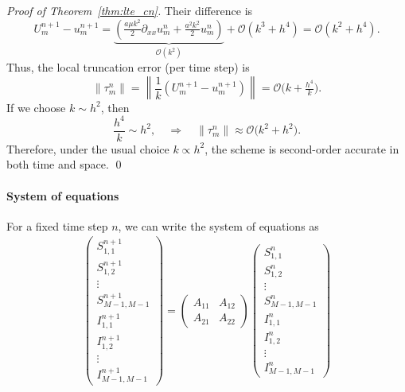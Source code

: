 \begin{proof}[Proof of Theorem~\ref{thm:lte_cn}]
  Their difference is
  \[
    U_m^{n+1} - u_m^{n+1} =
    \underbrace{\left(\tfrac{a\mu k^2}{2}\partial_{xx}u_m^n
      + \tfrac{a^2k^2}{2}u_m^n\right)}_{\mathcal{O}(k^2)}
    + \mathcal{O}\left(k^3 + h^4\right)
    = \mathcal{O}\left(k^2 + h^4\right).
  \]
  Thus, the local truncation error (per time step) is
  \[
    \lVert{\tau_m^n}\rVert
    = \left\lVert\dfrac{1}{k}\left(U_m^{n+1} - u_m^{n+1}\right) \right\rVert
    = \mathcal{O}\bigl(k + \tfrac{h^4}{k}\bigr).
  \]
  If we choose $k \sim h^2$, then
  \[
    \frac{h^4}{k} \sim h^2,
    \quad
    \Rightarrow
    \quad
    \lVert{\tau_m^n}\rVert \approx \mathcal{O}\bigl(k^2 + h^2\bigr).
  \]
  Therefore, under the usual choice $k \propto h^2$, the scheme is second-order accurate in both time and space. \qed
\end{proof}

\paragraph{System of equations}

For a fixed time step \(n\), we can write the system of equations as
\begin{align*}
  \begin{pmatrix}
    S_{1,1}^{n+1}     \\
    S_{1,2}^{n+1}     \\
    \vdots            \\
    S_{M-1,M-1}^{n+1} \\
    I_{1,1}^{n+1}     \\
    I_{1,2}^{n+1}     \\
    \vdots            \\
    I_{M-1,M-1}^{n+1}
  \end{pmatrix}
  =
  \begin{pmatrix}
    A_{11} & A_{12} \\
    A_{21} & A_{22}
  \end{pmatrix}
  \begin{pmatrix}
    S_{1,1}^n     \\
    S_{1,2}^n     \\
    \vdots        \\
    S_{M-1,M-1}^n \\
    I_{1,1}^n     \\
    I_{1,2}^n     \\
    \vdots        \\
    I_{M-1,M-1}^n
  \end{pmatrix}
\end{align*}


